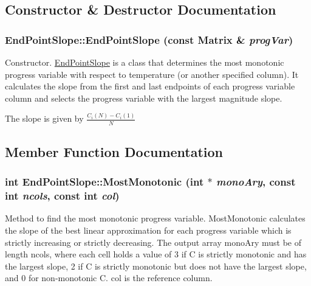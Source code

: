 \subsection{Constructor \& Destructor Documentation}
\hypertarget{classEndPointSlope_aa1c680c5137b40a465d2433e636892ce}{
\subsubsection[{EndPointSlope}]{\setlength{\rightskip}{0pt plus 5cm}EndPointSlope::EndPointSlope (const {\bf Matrix} \& {\em progVar})}}
\label{da/d7d/classEndPointSlope_aa1c680c5137b40a465d2433e636892ce}


Constructor. \hyperlink{classEndPointSlope}{EndPointSlope} is a class that determines the most monotonic progress variable with respect to temperature (or another specified column). It calculates the slope from the first and last endpoints of each progress variable column and selects the progress variable with the largest magnitude slope.

The slope is given by $ \frac{C_i(N) - C_i(1)}{N} $ 

\subsection{Member Function Documentation}
\hypertarget{classEndPointSlope_a70417721fe8a60669a67d19a7855bef5}{
\subsubsection[{MostMonotonic}]{\setlength{\rightskip}{0pt plus 5cm}int EndPointSlope::MostMonotonic (int $\ast$ {\em monoAry}, \/  const int {\em ncols}, \/  const int {\em col})}}
\label{da/d7d/classEndPointSlope_a70417721fe8a60669a67d19a7855bef5}


Method to find the most monotonic progress variable. MostMonotonic calculates the slope of the best linear approximation for each progress variable which is strictly increasing or strictly decreasing. The output array monoAry must be of length ncols, where each cell holds a value of 3 if C is strictly monotonic and has the largest slope, 2 if C is strictly monotonic but does not have the largest slope, and 0 for non-\/monotonic C. col is the reference column.

